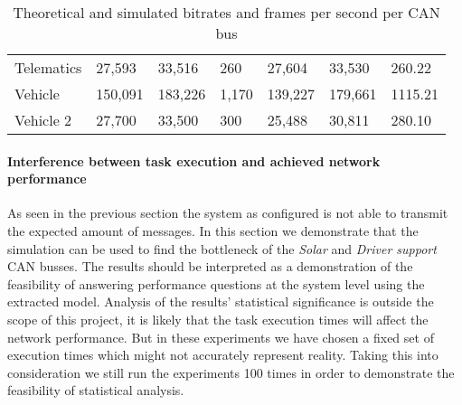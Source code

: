 \begin{table}[htb]
\begin{tabular}{@{}lllllll@{}}
        Telematics                                                   & 27,593                                                           & 33,516                                                           & 260                                                           & 27,604                                                          & 33,530                                                          & 260.22                                                        \\
        Vehicle                                                      & 150,091                                                          & 183,226                                                          & 1,170                                                         & 139,227                                                         & 179,661                                                         & 1115.21                                                       \\
        Vehicle 2                                                    & 27,700                                                           & 33,500                                                           & 300                                                           & 25,488                                                          & 30,811                                                          & 280.10                                                        \\ \hline
        \end{tabular}
        \caption{Theoretical and simulated bitrates and frames per second per CAN bus}
        \label{tab:bitrate_sim}
\end{table}

\paragraph{Interference between task execution and achieved network performance}
As seen in the previous section the system as configured is not able to transmit the expected amount of messages. In this section we demonstrate that the simulation can be used to find the bottleneck of the \textit{Solar} and \textit{Driver support} CAN busses. The results should be interpreted as a demonstration of the feasibility of answering performance questions at the system level using the extracted model. Analysis of the results' statistical significance is outside the scope of this project, it is likely that the task execution times will affect the network performance. But in these experiments we have chosen a fixed set of execution times which might not accurately represent reality. Taking this into consideration we still run the experiments 100 times in order to demonstrate the feasibility of statistical analysis.

